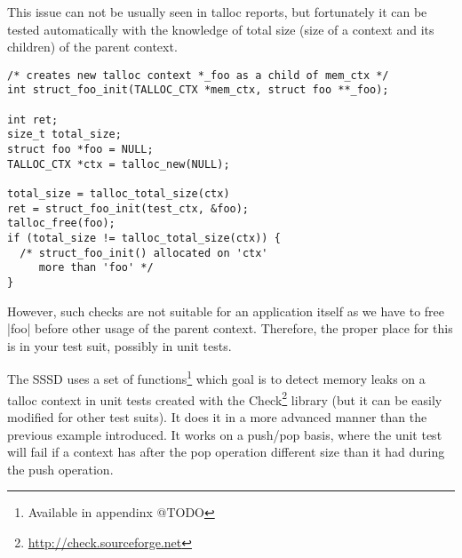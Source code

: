 This issue can not be usually seen in talloc reports, but fortunately it can be
tested automatically with the knowledge of total size (size of a context and
its children) of the parent context.

\begin{lstlisting}[caption={Memory leaks detection \#1},
morekeywords={talloc_total_size,talloc_free}]
/* creates new talloc context *_foo as a child of mem_ctx */
int struct_foo_init(TALLOC_CTX *mem_ctx, struct foo **_foo);

int ret;
size_t total_size;
struct foo *foo = NULL;
TALLOC_CTX *ctx = talloc_new(NULL);

total_size = talloc_total_size(ctx)
ret = struct_foo_init(test_ctx, &foo);
talloc_free(foo);
if (total_size != talloc_total_size(ctx)) {
  /* struct_foo_init() allocated on 'ctx'
     more than 'foo' */
}
\end{lstlisting}

However, such checks are not suitable for an application itself as we have to
free |foo| before other usage of the parent context. Therefore, the proper place
for this is in your test suit, possibly in unit tests.

The SSSD uses a set of functions\footnote{Available in appendinx @TODO} which
goal is to detect memory leaks on a talloc context in unit tests created with
the Check\footnote{\url{http://check.sourceforge.net}} library (but it can be
easily modified for other test suits). It does it in a more advanced manner than
the previous example introduced. It works on a push/pop basis, where the unit
test will fail if a context has after the pop operation different size than it
had during the push operation.

